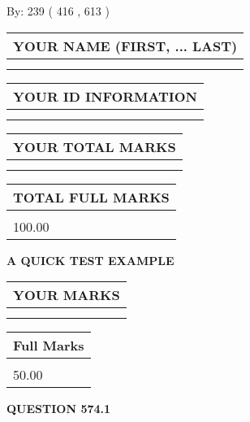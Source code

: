 \documentclass[12pt]{article}
\begin{document}
   
\hspace{1.0in} By: 
 239 ( 416 ,  613 )
   
   
   
   
\newpage 
\setcounter{page}{ 
   574001 } 
   
   
   
   
\noindent\begin{tabular}{|l|}
\hline
YOUR NAME (FIRST, ... LAST)  \\
\hline
 \\ 
 \\ 
\hline
\end{tabular}
\hspace{0.05in} \begin{tabular}{|l|}
\hline
 YOUR   ID   INFORMATION  \\
\hline
 \\ 
 \\ 
\hline
\end{tabular}
   
   
\vspace{0.2in}\noindent\begin{tabular}{|l|}
\hline
YOUR TOTAL MARKS  \\
\hline
 \\ 
 \\ 
\hline
\end{tabular}
\hspace{0.05in} \begin{tabular}{|l|}
\hline
TOTAL FULL MARKS  \\
\hline
 \\ 
100.00 \\
\hline
\end{tabular}
   
   
 \vspace{0.2in}
{\LARGE {\textbf{ A QUICK TEST EXAMPLE}}}
   
   
  
\vspace{0.2in}
  
\noindent\begin{tabular}{|l|}
\hline
 YOUR MARKS  \\
\hline
 \\ 
 \\ 
\hline
\end{tabular}
\hspace{0.05in} \begin{tabular}{|l|}
\hline
 Full Marks  \\
\hline
 \\ 
50.00 \\
\hline
\end{tabular}
{\textbf{\Large{QUESTION
574.1 
}}}
  
\end{document}
